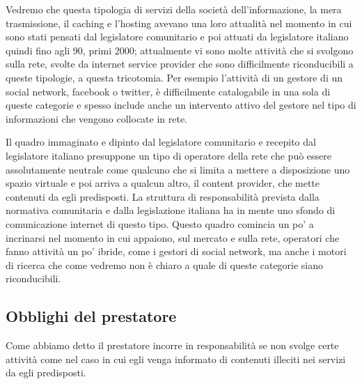 Vedremo che questa tipologia di servizi della società dell'informazione, la mera trasmissione, il caching e l'hosting avevano una loro attualità nel momento in cui sono stati pensati dal legislatore comunitario e poi attuati da legislatore italiano quindi fino agli 90, primi 2000; attualmente vi sono molte attività che si svolgono sulla rete, svolte da internet service provider che sono difficilmente riconducibili a queste tipologie, a questa tricotomia. Per esempio l'attività di un gestore di un social network, facebook o twitter, è difficilmente catalogabile in una sola di queste categorie e spesso include anche un intervento attivo del gestore nel tipo di informazioni che vengono collocate in rete. 

Il quadro immaginato e dipinto dal legislatore comunitario e recepito dal legislatore italiano presuppone un tipo di operatore della rete che può essere assolutamente neutrale come qualcuno che si limita a mettere a disposizione uno spazio virtuale e poi arriva a qualcun altro, il content provider, che mette contenuti da egli predisposti. La struttura di responsabilità prevista dalla normativa comunitaria e dalla legislazione italiana ha in mente uno sfondo di comunicazione internet di questo tipo. Questo quadro comincia un po' a incrinarsi nel momento in cui appaiono, sul mercato e sulla rete, operatori che fanno attività un po' ibride, come i gestori di social network, ma anche i motori di ricerca che come vedremo non è chiaro a quale di queste categorie siano riconducibili. 

\subsection{Obblighi del prestatore}

Come abbiamo detto il prestatore incorre in responsabilità se non svolge certe attività come nel caso in cui egli venga informato di contenuti illeciti nei servizi da egli predisposti. 

